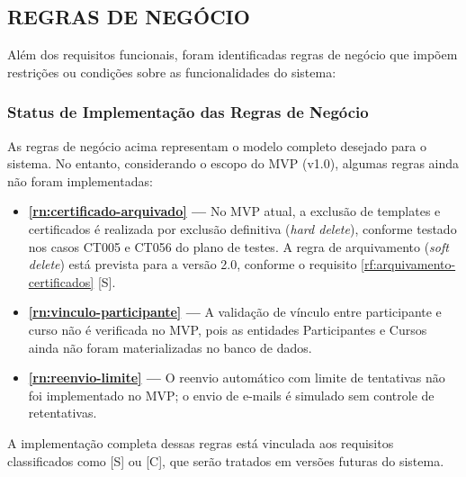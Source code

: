 \subsection{REGRAS DE NEGÓCIO}

Além dos requisitos funcionais, foram identificadas regras de negócio que impõem restrições ou condições sobre as funcionalidades do sistema:

\vspace{0.5em}
\begin{itemize}
\end{itemize}

\subsubsection{Status de Implementação das Regras de Negócio}

As regras de negócio acima representam o modelo completo desejado para o sistema. No entanto, considerando o escopo do MVP (v1.0), algumas regras ainda não foram implementadas:

\vspace{0.5em}
\begin{itemize}
\item \textbf{\ref{rn:certificado-arquivado} ---} No MVP atual, a exclusão de templates e certificados é realizada por exclusão definitiva (\textit{hard delete}), conforme testado nos casos CT005 e CT056 do plano de testes. A regra de arquivamento (\textit{soft delete}) está prevista para a versão 2.0, conforme o requisito \ref{rf:arquivamento-certificados} [S].
\item \textbf{\ref{rn:vinculo-participante} ---} A validação de vínculo entre participante e curso não é verificada no MVP, pois as entidades Participantes e Cursos ainda não foram materializadas no banco de dados.
\item \textbf{\ref{rn:reenvio-limite} ---} O reenvio automático com limite de tentativas não foi implementado no MVP; o envio de e-mails é simulado sem controle de retentativas.
\end{itemize}

A implementação completa dessas regras está vinculada aos requisitos classificados como [S] ou [C], que serão tratados em versões futuras do sistema.

